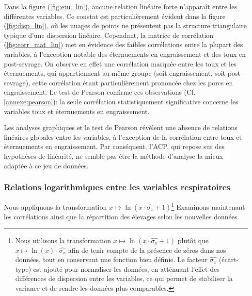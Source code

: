 \documentclass{article}
\begin{document}
Dans la figure (\ref{fig:etu_lin}), aucune relation linéaire forte n’apparaît entre les différentes variables. Ce constat est particulièrement évident dans la figure (\ref{fig:disp_lin}), où les nuages de points ne présentent pas la structure triangulaire typique d’une dispersion linéaire.
Cependant, la matrice de corrélation (\ref{fig:corr_mat_lin}) met en évidence des faibles corrélations entre la plupart des variables, à l’exception notable des éternuements en engraissement et des toux en post-sevrage. On observe en effet une corrélation marquée entre les toux et les éternuements, qui appartiennent au même groupe (soit engraissement, soit post-sevrage), cette corrélation étant particulièrement prononcée chez les porcs en engraissement.
Le test de Pearson confirme ces observations (Cf.\text{ }\ref{annexe:pearson}): la seule corrélation statistiquement significative concerne les variables toux et éternuements en engraissement.

Les analyses graphiques et le test de Pearson révèlent une absence de relations linéaires globales entre les variables, à l'exception de la corrélation entre toux et éternuements en engraissement. Par conséquent, l'ACP, qui repose sur des hypothèses de linéarité, ne semble pas être la méthode d'analyse la mieux adaptée à ce jeu de données.


\subsubsection{Relations logarithmiques entre les variables respiratoires}
Nous appliquons la transformation $x \longmapsto \ln(x \cdot \hat{{\sigma_x}} + 1)$\text{ }\footnote{Nous utilisons la transformation \( x \longmapsto \ln(x \cdot \hat{{\sigma_x}} + 1) \) plutôt que \( x \longmapsto \ln(x) \cdot \hat{{\sigma_x}} \) afin de tenir compte de la présence de zéros dans nos données, tout en conservant une fonction bien définie. Le facteur \( \hat{{\sigma_x}}  \) (écart-type) est ajouté pour normaliser les données, en atténuant l'effet des différences de dispersion entre les variables, ce qui permet de stabiliser la variance et de rendre les données plus comparables.}
Examinons maintenant les corrélations ainsi que la répartition des élevages selon les nouvelles données.

\newpage
\end{document}

